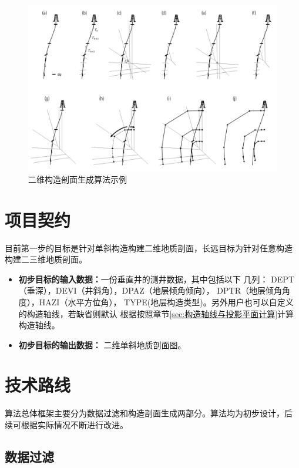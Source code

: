\documentclass[a4paper,twoside]{ctexart}
\begin{document}
 \begin{figure}[htbp]
  \centering
    \includegraphics[width=\textwidth]{pic/蛛网法.png}
  \caption{二维构造剖面生成算法示例}
  \label{fig:蛛网法}
\end{figure}


\section{项目契约}

目前第一步的目标是针对单斜构造构建二维地质剖面，长远目标为针对任意构造
构建二三维地质剖面。

\begin{itemize}
\item \textbf{初步目标的输入数据：}一份垂直井的测井数据，其中包括以下
  几列：
  DEPT（垂深），DEVI（井斜角），DPAZ（地层倾角倾向），
  DPTR（地层倾角角度），HAZI（水平方位角），
  TYPE(地层构造类型)。另外用户也可以自定义的构造轴线，若缺省则默认
  根据按照章节\ref{sec:构造轴线与投影平面计算}计算构造轴线。
\item \textbf{初步目标的输出数据：} 二维单斜地质剖面图。
\end{itemize}

\section{技术路线}

算法总体框架主要分为数据过滤和构造剖面生成两部分。算法均为初步设计，后
续可根据实际情况不断进行改进。

\subsection{数据过滤}
\end{document}
